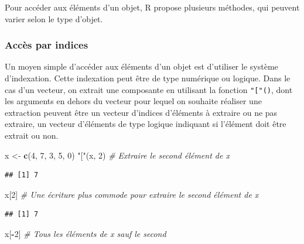 \documentclass[
  11pt,
]{book}
\newenvironment{Shaded}{\begin{snugshade}}{\end{snugshade}}
\newcommand{\CommentTok}[1]{\textcolor[rgb]{0.56,0.35,0.01}{\textit{#1}}}
\newcommand{\DecValTok}[1]{\textcolor[rgb]{0.00,0.00,0.81}{#1}}
\newcommand{\KeywordTok}[1]{\textcolor[rgb]{0.13,0.29,0.53}{\textbf{#1}}}
\newcommand{\NormalTok}[1]{#1}
\newcommand{\OperatorTok}[1]{\textcolor[rgb]{0.81,0.36,0.00}{\textbf{#1}}}
\newcommand{\StringTok}[1]{\textcolor[rgb]{0.31,0.60,0.02}{#1}}
\numberwithin{equation}{section}
\numberwithin{countremarque}{section}
\begin{document}
Pour accéder aux éléments d'un objet, R propose plusieurs méthodes, qui peuvent varier selon le type d'objet.

\hypertarget{accuxe8s-par-indices}{%
\subsubsection{Accès par indices}\label{accuxe8s-par-indices}}

Un moyen simple d'accéder aux éléments d'un objet est d'utiliser le système d'indexation. Cette indexation peut être de type numérique ou logique. Dans le cas d'un vecteur, on extrait une composante en utilisant la fonction \texttt{"{[}"()}, dont les arguments en dehors du vecteur pour lequel on souhaite réaliser une extraction peuvent être un vecteur d'indices d'éléments à extraire ou ne pas extraire, un vecteur d'éléments de type logique indiquant si l'élément doit être extrait ou non.

\begin{Shaded}
\begin{Highlighting}[]
\NormalTok{x \textless{}{-}}\StringTok{ }\KeywordTok{c}\NormalTok{(}\DecValTok{4}\NormalTok{, }\DecValTok{7}\NormalTok{, }\DecValTok{3}\NormalTok{, }\DecValTok{5}\NormalTok{, }\DecValTok{0}\NormalTok{)}
\StringTok{"["}\NormalTok{(x, }\DecValTok{2}\NormalTok{)  }\CommentTok{\# Extraire le second élément de x}
\end{Highlighting}
\end{Shaded}

\begin{lstlisting}
## [1] 7
\end{lstlisting}

\begin{Shaded}
\begin{Highlighting}[]
\NormalTok{x[}\DecValTok{2}\NormalTok{]    }\CommentTok{\# Une écriture plus commode pour extraire le second élément de x}
\end{Highlighting}
\end{Shaded}

\begin{lstlisting}
## [1] 7
\end{lstlisting}

\begin{Shaded}
\begin{Highlighting}[]
\NormalTok{x[}\OperatorTok{{-}}\DecValTok{2}\NormalTok{]   }\CommentTok{\# Tous les éléments de x sauf le second}
\end{Highlighting}
\end{Shaded}
\end{document}
